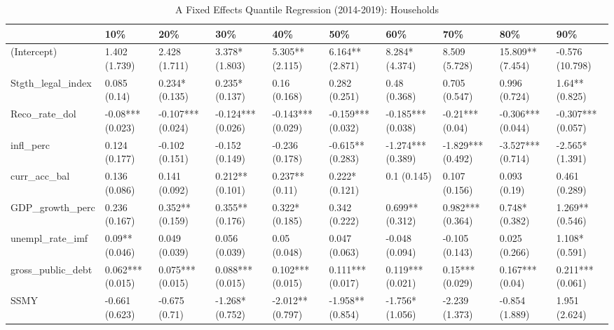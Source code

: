 \begin{table}[ht]
\centering
\caption{A Fixed Effects Quantile Regression (2014-2019): Households} 
\begingroup\small
\begin{tabular}{llllllllll}
  \toprule
 & 10\% & 20\% & 30\% & 40\% & 50\% & 60\% & 70\% & 80\% & 90\% \\ 
  \midrule
(Intercept) & 1.402 (1.739) & 2.428 (1.711) & 3.378* (1.803) & 5.305** (2.115) & 6.164** (2.871) & 8.284* (4.374) & 8.509 (5.728) & 15.809** (7.454) & -0.576 (10.798) \\ 
  Stgth\_legal\_index & 0.085 (0.14) & 0.234* (0.135) & 0.235* (0.137) & 0.16 (0.168) & 0.282 (0.251) & 0.48 (0.368) & 0.705 (0.547) & 0.996 (0.724) & 1.64** (0.825) \\ 
  Reco\_rate\_dol & -0.08*** (0.023) & -0.107*** (0.024) & -0.124*** (0.026) & -0.143*** (0.029) & -0.159*** (0.032) & -0.185*** (0.038) & -0.21*** (0.04) & -0.306*** (0.044) & -0.307*** (0.057) \\ 
  infl\_perc & 0.124 (0.177) & -0.102 (0.151) & -0.152 (0.149) & -0.236 (0.178) & -0.615** (0.283) & -1.274*** (0.389) & -1.829*** (0.492) & -3.527*** (0.714) & -2.565* (1.391) \\ 
  curr\_acc\_bal & 0.136 (0.086) & 0.141 (0.092) & 0.212** (0.101) & 0.237** (0.11) & 0.222* (0.121) & 0.1 (0.145) & 0.107 (0.156) & 0.093 (0.19) & 0.461 (0.289) \\ 
  GDP\_growth\_perc & 0.236 (0.167) & 0.352** (0.159) & 0.355** (0.176) & 0.322* (0.185) & 0.342 (0.222) & 0.699** (0.312) & 0.982*** (0.364) & 0.748* (0.382) & 1.269** (0.546) \\ 
  unempl\_rate\_imf & 0.09** (0.046) & 0.049 (0.039) & 0.056 (0.039) & 0.05 (0.048) & 0.047 (0.063) & -0.048 (0.094) & -0.105 (0.143) & 0.025 (0.266) & 1.108* (0.591) \\ 
  gross\_public\_debt & 0.062*** (0.015) & 0.075*** (0.015) & 0.088*** (0.015) & 0.102*** (0.015) & 0.111*** (0.017) & 0.119*** (0.021) & 0.15*** (0.029) & 0.167*** (0.04) & 0.211*** (0.061) \\ 
  SSMY & -0.661 (0.623) & -0.675 (0.71) & -1.268* (0.752) & -2.012** (0.797) & -1.958** (0.854) & -1.756* (1.056) & -2.239 (1.373) & -0.854 (1.889) & 1.951 (2.624) \\ 
   \bottomrule
\end{tabular}
\endgroup
\end{table}
